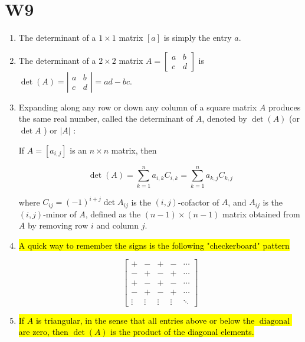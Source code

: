 \documentclass[10pt]{article}
\begin{document}
\section{W9}
\begin{enumerate}
\item The determinant of a $1 \times 1$ matrix $[a]$ is simply the entry $a$.

\item The determinant of a $2 \times 2$ matrix $A=\left[\begin{array}{ll}a & b \\ c & d\end{array}\right]$ is $\operatorname{det}(A)=\left|\begin{array}{ll}a & b \\ c & d\end{array}\right|=a d-b c$.

\item Expanding along any row or down any column of a square matrix $A$ produces the same real number, called the determinant of $A$, denoted by $\operatorname{det}(A)$ (or $\operatorname{det} A$ ) or $|A|$ :

If $A=\left[a_{i, j}\right]$ is an $n \times n$ matrix, then

$$
\operatorname{det}(A)=\sum_{k=1}^{n} a_{i, k} C_{i, k}=\sum_{k=1}^{n} a_{k, j} C_{k, j}
$$

where $C_{i j}=(-1)^{i+j} \operatorname{det} A_{i j}$ is the $(i, j)$-cofactor of $A$, and $A_{i j}$ is the $(i, j)$-minor of $A$, defined as the $(n-1) \times(n-1)$ matrix obtained from $A$ by removing row $i$ and column $j$.

\item \hl{A quick way to remember the signs is the following "checkerboard" pattern}

$$
\left[\begin{array}{ccccc}
+ & - & + & - & \cdots \\
- & + & - & + & \cdots \\
+ & - & + & - & \cdots \\
- & + & - & + & \cdots \\
\vdots & \vdots & \vdots & \vdots & \ddots
\end{array}\right]
$$

\item \hl{If $A$ is triangular, in the sense that all entries above or below the $\operatorname{diagonal}$ are zero, then $\operatorname{det}(A)$ is the product of the diagonal elements.}


\end{enumerate}
\end{document}
